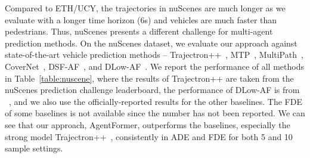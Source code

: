 \documentclass[10pt,twocolumn,letterpaper]{article}
\newcommand{\mname}{AgentFormer}
\begin{document}
Compared to ETH/UCY, the trajectories in nuScenes are much longer as we evaluate with a longer time horizon (6s) and vehicles are much faster than pedestrians. Thus, nuScenes presents a different challenge for multi-agent prediction methods. On the nuScenes dataset, we evaluate our approach against state-of-the-art vehicle prediction methods -- Trajectron++~\cite{salzmann2020trajectron++}, MTP~\cite{cui2019multimodal}, MultiPath~\cite{chai2020multipath}, CoverNet~\cite{phan2020covernet}, DSF-AF~\cite{ma2020diverse}, and DLow-AF~\cite{yuan2020dlow}. We report the performance of all methods in Table~\ref{table:nuscene}, where the results of Trajectron++ are taken from the nuScenes prediction challenge leaderboard, the performance of DLow-AF is from ~\cite{ma2020diverse}, and we also use the officially-reported results for the other baselines. The FDE of some baselines is not available since the number has not been reported. We can see that our approach, \mname, outperforms the baselines, especially the strong model Trajectron++~\cite{salzmann2020trajectron++}, consistently in ADE and FDE for both 5 and 10 sample settings.
\end{document}
